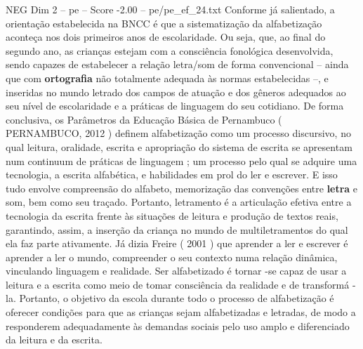 \begin{textsample}{NEG Dim 2 – pe – Score -2.00 – pe/pe\_ef\_24.txt}
Conforme já salientado, a orientação estabelecida na BNCC é que a sistematização da alfabetização aconteça nos dois primeiros anos de escolaridade.
Ou seja, que, ao final do segundo ano, as crianças estejam com a consciência fonológica desenvolvida, sendo capazes de estabelecer a relação letra/som de forma convencional – ainda que com \textbf{ortografia} não totalmente adequada às normas estabelecidas –, e inseridas no mundo letrado dos campos de atuação e dos gêneros adequados ao seu nível de escolaridade e a práticas de linguagem do seu cotidiano.
De forma conclusiva, os Parâmetros da Educação Básica de Pernambuco ( PERNAMBUCO, 2012 ) definem alfabetização como um processo discursivo, no qual leitura, oralidade, escrita e apropriação do sistema de escrita se apresentam num continuum de práticas de linguagem ; um processo pelo qual se adquire uma tecnologia, a escrita alfabética, e habilidades em prol do ler e escrever.
E isso tudo envolve compreensão do alfabeto, memorização das convenções entre \textbf{letra} e som, bem como seu traçado.
Portanto, letramento é a articulação efetiva entre a tecnologia da escrita frente às situações de leitura e produção de textos reais, garantindo, assim, a inserção da criança no mundo de multiletramentos do qual ela faz parte ativamente.
Já dizia Freire ( 2001 ) que aprender a ler e escrever é aprender a ler o mundo, compreender o seu contexto numa relação dinâmica, vinculando linguagem e realidade.
Ser alfabetizado é tornar -se capaz de usar a leitura e a escrita como meio de tomar consciência da realidade e de transformá -la.
Portanto, o objetivo da escola durante todo o processo de alfabetização é oferecer condições para que as crianças sejam alfabetizadas e letradas, de modo a responderem adequadamente às demandas sociais pelo uso amplo e diferenciado da leitura e da escrita.

\end{textsample}
